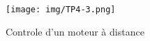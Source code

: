 
\begin{figure}[H]
	\centering
	\texttt{[image: img/TP4-3.png]}
	\caption{\label{TP4.3}Controle d'un moteur à distance}
\end{figure}


% 
